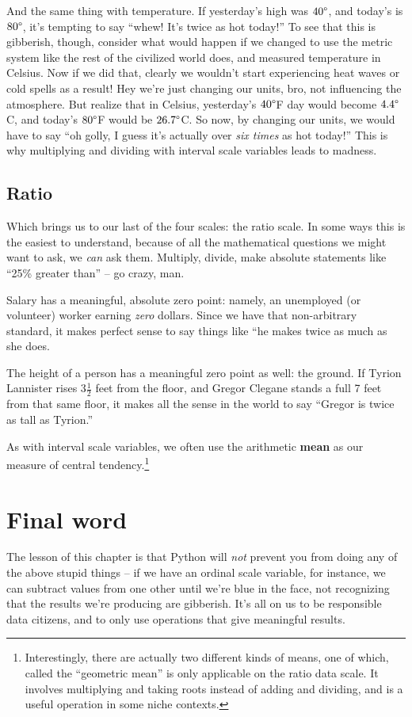 And the same thing with temperature. If yesterday's high was $40\degree$, and
today's is $80\degree$, it's tempting to say ``whew! It's twice as hot today!''
To see that this is gibberish, though, consider what would happen if we changed
to use the metric system like the rest of the civilized world does, and
measured temperature in Celsius. Now if we did that, clearly we wouldn't start
experiencing heat waves or cold spells as a result! Hey we're just changing our
units, bro, not influencing the atmosphere. But realize that in Celsius,
yesterday's $40\degree$F day would become $4.4\degree$C, and today's
$80\degree$F would be $26.7\degree$C. So now, by changing our units, we would
have to say ``oh golly, I guess it's actually over \textit{six times} as hot
today!'' This is why multiplying and dividing with interval scale variables
leads to madness.


\subsection{Ratio}

Which brings us to our last of the four scales: the ratio scale. In some ways
this is the easiest to understand, because of all the mathematical questions
we might want to ask, we \textit{can} ask them. Multiply, divide, make 
absolute statements like ``25\% greater than'' -- go crazy, man.

Salary has a meaningful, absolute zero point: namely, an unemployed (or
volunteer) worker earning \textit{zero} dollars. Since we have that
non-arbitrary standard, it makes perfect sense to say things like ``he makes
twice as much as she does.

The height of a person has a meaningful zero point as well: the ground. If
Tyrion Lannister rises $3\frac{1}{2}$ feet from the floor, and Gregor Clegane
stands a full 7 feet from that same floor, it makes all the sense in the world
to say ``Gregor is twice as tall as Tyrion.''

As with interval scale variables, we often use the arithmetic \textbf{mean}  as
our measure of central tendency.\footnote{Interestingly, there are actually two
different kinds of means, one of which, called the ``geometric mean'' is only
applicable on the ratio data scale. It involves multiplying and taking roots
instead of adding and dividing, and is a useful operation in some niche
contexts.}

\section{Final word}
The lesson of this chapter is that Python will \textit{not} prevent you from
doing any of the above stupid things -- if we have an ordinal scale variable,
for instance, we can subtract values from one other until we're blue in the
face, not recognizing that the results we're producing are gibberish. It's all
on us to be responsible data citizens, and to only use operations that give
meaningful results.
